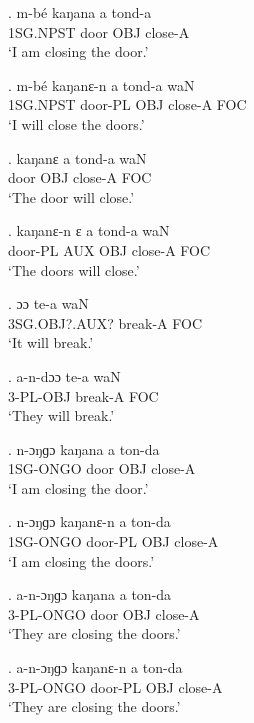 \documentclass{assets/fieldnotes}
\begin{document}
\exg.
m-bé       kaŋana   a     tond-a  \\
1SG.NPST   door     OBJ   close-A \\%
`I am closing the door.'

\exg.
m-bé       kaŋanɛ-n   a     tond-a    waN \\
1SG.NPST   door-PL    OBJ   close-A   FOC \\%
`I will close the doors.'

\exg.
kaŋanɛ   a     tond-a    waN \\
door     OBJ   close-A   FOC \\%
`The door will close.'

\exg.
kaŋanɛ-n   ɛ     a     tond-a    waN \\
door-PL    AUX   OBJ   close-A   FOC \\%
`The doors will close.' \label{The doors will close}


\exg.
ɔɔ              te-a      waN \\
3SG.OBJ?.AUX?   break-A   FOC \\%
`It will break.' \label{It will break}


\exg.
a-n-dɔɔ         te-a      waN \\
3-PL-OBJ   break-A   FOC \\%
`They will break.'

\exg.
n-ɔŋɡɔ     kaŋana   a     ton-da  \\
1SG-ONGO   door     OBJ   close-A \\%
`I am closing the door.'

\exg.
n-ɔŋɡɔ     kaŋanɛ-n   a     ton-da  \\
1SG-ONGO   door-PL    OBJ   close-A \\%
`I am closing the doors.'

\exg.
a-n-ɔŋɡɔ    kaŋana   a     ton-da  \\
3-PL-ONGO   door     OBJ   close-A \\%
`They are closing the doors.'

\exg.
a-n-ɔŋɡɔ    kaŋanɛ-n   a     ton-da  \\
3-PL-ONGO   door-PL    OBJ   close-A \\%
`They are closing the doors.'
\end{document}
